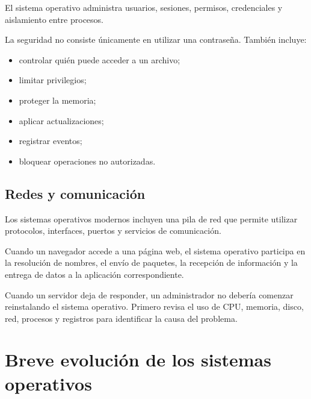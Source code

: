 \documentclass[
  spanish,
  letterpaper,
]{scrbook}
\providecommand{\tightlist}{%
  \setlength{\itemsep}{0pt}\setlength{\parskip}{0pt}}
\begin{document}
El sistema operativo administra usuarios, sesiones, permisos,
credenciales y aislamiento entre procesos.

La seguridad no consiste únicamente en utilizar una contraseña. También
incluye:

\begin{itemize}
\tightlist
\item
  controlar quién puede acceder a un archivo;
\item
  limitar privilegios;
\item
  proteger la memoria;
\item
  aplicar actualizaciones;
\item
  registrar eventos;
\item
  bloquear operaciones no autorizadas.
\end{itemize}

\section{Redes y comunicación}\label{redes-y-comunicaciuxf3n}

Los sistemas operativos modernos incluyen una pila de red que permite
utilizar protocolos, interfaces, puertos y servicios de comunicación.

Cuando un navegador accede a una página web, el sistema operativo
participa en la resolución de nombres, el envío de paquetes, la
recepción de información y la entrega de datos a la aplicación
correspondiente.

\begin{tcolorbox}[enhanced jigsaw, arc=.35mm, bottomrule=.15mm, bottomtitle=1mm, breakable, colback=white, colbacktitle=quarto-callout-tip-color!10!white, colframe=quarto-callout-tip-color-frame, coltitle=black, left=2mm, leftrule=.75mm, opacityback=0, opacitybacktitle=0.6, rightrule=.15mm, title=\textcolor{quarto-callout-tip-color}{\faLightbulb}\hspace{0.5em}{En la práctica profesional}, titlerule=0mm, toprule=.15mm, toptitle=1mm]

Cuando un servidor deja de responder, un administrador no debería
comenzar reinstalando el sistema operativo. Primero revisa el uso de
CPU, memoria, disco, red, procesos y registros para identificar la causa
del problema.

\end{tcolorbox}


\chapter{Breve evolución de los sistemas
operativos}\label{breve-evoluciuxf3n-de-los-sistemas-operativos}
\end{document}
